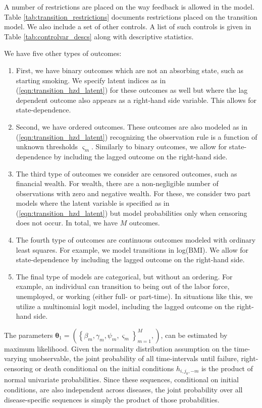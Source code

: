 A number of restrictions are placed on the way feedback is allowed in the model.  
Table \ref{tab:transition_restrictions} documents restrictions placed on the 
transition model. We also include a set of other controls. A list of such controls 
is given in Table \ref{tab:controlvar_descs} along with descriptive statistics. 

We have five other types of outcomes:
\begin{enumerate}
\item First, we have binary outcomes which are not an absorbing state, such as starting smoking. We specify latent 
indices as in (\ref{eqn:transition_hzd_latent}) for these outcomes as well but where 
the lag dependent outcome also appears as a right-hand side variable. This allows for state-dependence. 

\item Second, we have ordered outcomes. These outcomes are also modeled as in (\ref{eqn:transition_hzd_latent}) recognizing the observation rule is 
a function of unknown thresholds $\varsigma_m$. Similarly to binary outcomes, we allow for state-dependence by including the lagged outcome 
on the right-hand side.

\item The third type of outcomes we consider are censored outcomes, such as financial wealth. For wealth, 
there are a non-negligible number of observations with zero and negative wealth. For these, we consider 
two part models where the latent variable is specified as in (\ref{eqn:transition_hzd_latent}) but model 
probabilities only when censoring does not occur. In total, we have $M$ outcomes.

\item The fourth type of outcomes are continuous outcomes modeled with ordinary least squares.  For example,
we model transitions in log(BMI).  We allow for state-dependence by including the lagged outcome on the right-hand side.

\item The final type of models are categorical, but without an ordering.  For example, an individual can transition
to being out of the labor force, unemployed, or working (either full- or part-time).  In situations like this, we utilize
a multinomial logit model, including the lagged outcome on the right-hand side.

\end{enumerate}

The parameters 
$\mathbf{\theta}_1 = \left(\left\{\beta_m, \gamma_m, \psi_m, \varsigma_m\right\}_{m=1}^M, \right)$, 
can be estimated by maximum likelihood. Given the normality distribution assumption on the 
time-varying unobservable, the joint probability of all time-intervals until failure, right-censoring 
or death conditional on the initial conditions $h_{i,j_0,-m}$ is the product of 
normal univariate probabilities. Since these sequences, conditional on initial 
conditions, are also independent across diseases, the joint 
probability over all disease-specific sequences is simply the product of 
those probabilities. 

